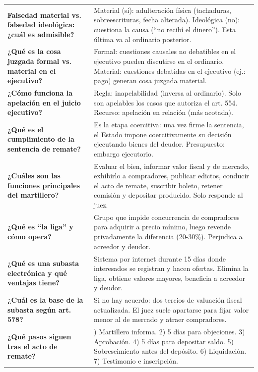 \documentclass[12pt,oneside]{book}
\begin{document}
\begin{table}[H]
\begin{tabularx}{\textwidth}{
    >{\raggedright\arraybackslash}p{}
    >{\raggedright\arraybackslash}X
}
\textbf{Falsedad material vs. falsedad ideológica: ¿cuál es admisible?} & Material (sí): adulteración física (tachaduras, sobreescrituras, fecha alterada). Ideológica (no): cuestiona la causa (``no recibí el dinero''). Esta última va al ordinario posterior. \\

\textbf{¿Qué es la cosa juzgada formal vs. material en el ejecutivo?} & Formal: cuestiones causales no debatibles en el ejecutivo pueden discutirse en el ordinario. Material: cuestiones debatidas en el ejecutivo (ej.: pago) generan cosa juzgada material. \\

\textbf{¿Cómo funciona la apelación en el juicio ejecutivo?} & Regla: inapelabilidad (inversa al ordinario). Solo son apelables los casos que autoriza el art. 554. Recurso: apelación en relación (más acotada). \\

\textbf{¿Qué es el cumplimiento de la sentencia de remate?} & Es la etapa coercitiva: una vez firme la sentencia, el Estado impone coercitivamente su decisión ejecutando bienes del deudor. Presupuesto: embargo ejecutorio. \\

\textbf{¿Cuáles son las funciones principales del martillero?} & Evaluar el bien, informar valor fiscal y de mercado, exhibirlo a compradores, publicar edictos, conducir el acto de remate, suscribir boleto, retener comisión y depositar producido. Solo responde al juez. \\

\textbf{¿Qué es ``la liga'' y cómo opera?} & Grupo que impide concurrencia de compradores para adquirir a precio mínimo, luego revende privadamente la diferencia (20-30\%). Perjudica a acreedor y deudor. \\

\textbf{¿Qué es una subasta electrónica y qué ventajas tiene?} & Sistema por internet durante 15 días donde interesados se registran y hacen ofertas. Elimina la liga, obtiene valores mayores, beneficia a acreedor y deudor. \\

\textbf{¿Cuál es la base de la subasta según art. 578?} & Si no hay acuerdo: dos tercios de valuación fiscal actualizada. El juez suele apartarse para fijar valor menor al de mercado y atraer compradores. \\

\textbf{¿Qué pasos siguen tras el acto de remate?} & 1) Martillero informa. 2) 5 días para objeciones. 3) Aprobación. 4) 5 días para depositar saldo. 5) Sobreseimiento antes del depósito. 6) Liquidación. 7) Testimonio e inscripción. \\


\end{tabularx}
\end{table}
\end{document}
